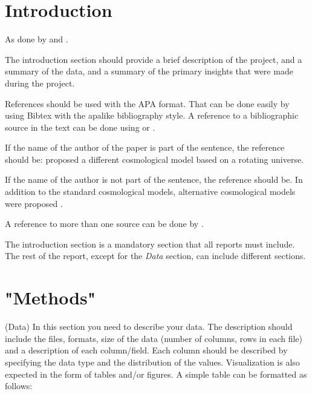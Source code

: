 \documentclass[article,pdftex,12pt,a4paper]{article}
\begin{document}
\section{Introduction}
As done by \cite{einstein2013einstein} and \cite{dhar2013data}.

The introduction section should provide a brief description of the project, and a summary of the data, and a summary of the primary insights that were made during the project.

References should be used with the APA format. That can be done easily by using Bibtex with the apalike bibliography style. A reference to a bibliographic source in the text can be done using \cite{ozsvath2001approaches} or \citep{ellis1979homogeneity}.

If the name of the author of the paper is part of the sentence, the reference should be: \cite{ozsvath2001approaches} proposed a different cosmological model based on a rotating universe. 

If the name of the author is not part of the sentence, the reference should be. In addition to the standard cosmological models, alternative cosmological models were proposed \citep{ozsvath2001approaches}.

A reference to more than one source can be done by \citep{ozsvath1962finite,godel1949example}.

The introduction section is a mandatory section that all reports must include. The rest of the report, except for the {\it Data} section, can include different sections.


\section{"Methods"}
(Data) In this section you need to describe your data. The description should include the files, formats, size of the data (number of columns, rows in each file) and a description of each column/field. Each column should be described by specifying the data type and the distribution of the values. Visualization is also expected in the form of tables and/or figures. A simple table can be formatted as follows:
\end{document}
